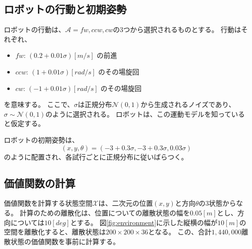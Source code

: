 \subsection{ロボットの行動と初期姿勢}
ロボットの行動は、$\mathcal{A} = { fw, ccw, cw }$の3つから選択されるものとする。
行動はそれぞれ、
\begin{itemize}
  \item $fw$: $(0.2 + 0.01\sigma) \si{[m/s]}$ の前進
  \item $ccw$: $(1 + 0.01\sigma) \si{[rad/s]}$ のその場旋回
  \item $cw$: $(-1 + 0.01\sigma) \si{[rad/s]}$ のその場旋回
\end{itemize}
を意味する。
ここで、$\sigma$は正規分布$\mathcal{N}(0, 1)$から生成されるノイズであり、$\sigma \sim \mathcal{{N}}(0, 1)$のように選択される。
ロボットは、この運動モデルを知っていると仮定する。

ロボットの初期姿勢は、
\begin{equation}
\label{robot initial pose}
  (x, y, \theta) = (-3 + 0.3\sigma, -3 + 0.3\sigma, 0.03\sigma)
\end{equation}
のように配置され、各試行ごとに正規分布に従いばらつく。

\subsection{価値関数の計算}
価値関数を計算する状態空間$\mathcal{X}$は、二次元の位置$(x, y)$と方向$\theta$の3状態からなる。
計算のための離散化は、位置についての離散状態の幅を$0.05\si{[m]}$とし、方向については$10\si{[deg]}$とする。
図\ref{fig:environment}に示した縦横の幅が$10\si{[m]}$の空間を離散化すると、離散状態は$200 \times 200 \times 36$となる。
この、合計$1,440,000$離散状態の価値関数を事前に計算する。

